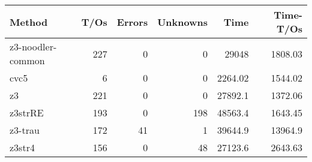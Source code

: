 \begin{tabular}{lrrrrr}
\hline
 Method            &   T/Os &   Errors &   Unknowns &     Time &   Time-T/Os \\
\hline
 z3-noodler-common &    227 &        0 &          0 & 29048    &     1808.03 \\
 cvc5              &      6 &        0 &          0 &  2264.02 &     1544.02 \\
 z3                &    221 &        0 &          0 & 27892.1  &     1372.06 \\
 z3strRE           &    193 &        0 &        198 & 48563.4  &     1643.45 \\
 z3-trau           &    172 &       41 &          1 & 39644.9  &    13964.9  \\
 z3str4            &    156 &        0 &         48 & 27123.6  &     2643.63 \\
\hline
\end{tabular}
